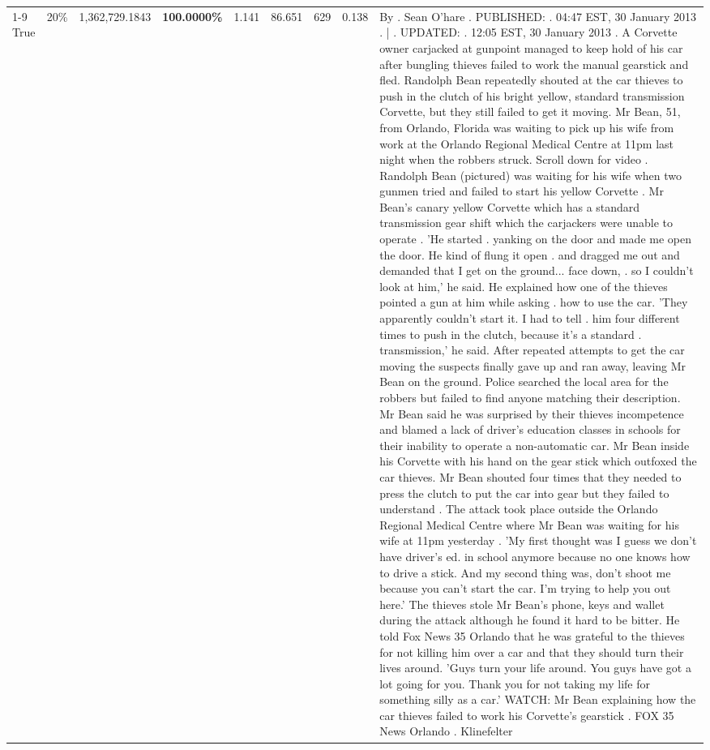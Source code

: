\begin{table}[H]
\begin{tabular}{lllrlllll}
\cline{1-9} \cline{2-9}
True & 20\% & 1,362,729.1843 & \bfseries \color{red} 100.0000\% & 1.141 & 86.651 & 629 & 0.138 & By . Sean O'hare . PUBLISHED: . 04:47 EST, 30 January 2013 . | . UPDATED: . 12:05 EST, 30 January 2013 . A Corvette owner carjacked at gunpoint managed to keep hold of his car after bungling thieves failed to work the manual gearstick and fled. Randolph Bean repeatedly shouted at the car thieves to push in the clutch of his bright yellow, standard transmission Corvette, but they still failed to get it moving. Mr Bean, 51, from Orlando, Florida was waiting to pick up his wife from work at the Orlando Regional Medical Centre at 11pm last night when the robbers struck. Scroll down for video . Randolph Bean (pictured) was waiting for his wife when two gunmen tried and failed to start his yellow Corvette . Mr Bean's canary yellow Corvette which has a standard transmission gear shift which the carjackers were unable to operate . 'He started . yanking on the door and made me open the door. He kind of flung it open . and dragged me out and demanded that I get on the ground... face down, . so I couldn't look at him,' he said. He explained how one of the thieves pointed a gun at him while asking . how to use the car. 'They apparently couldn't start it. I had to tell . him four different times to push in the clutch, because it's a standard . transmission,' he said. After repeated attempts to get the car moving the suspects finally gave up and ran away, leaving Mr Bean on the ground. Police searched the local area for the robbers but failed to find anyone matching their description. Mr Bean said he was surprised by their thieves incompetence and blamed a lack of driver's education classes in schools for their inability to operate a non-automatic car. Mr Bean inside his Corvette with his hand on the gear stick which outfoxed the car thieves. Mr Bean shouted four times that they needed to press the clutch to put the car into gear but they failed to understand . The attack took place outside the Orlando Regional Medical Centre where Mr Bean was waiting for his wife at 11pm yesterday . 'My first thought was I guess we don't have driver's ed. in school anymore because no one knows how to drive a stick. And my second thing was, don't shoot me because you can't start the car. I'm trying to help you out here.' The thieves stole Mr Bean's phone, keys and wallet during the attack although he found it hard to be bitter. He told Fox News 35 Orlando that he was grateful to the thieves for not killing him over a car and that they should turn their lives around. 'Guys turn your life around. You guys have got a lot going for you. Thank you for not taking my life for something silly as a car.' WATCH: Mr Bean explaining how the car thieves failed to work his Corvette's gearstick . FOX 35 News Orlando . Klinefelter \\

\end{tabular}
\end{table}

